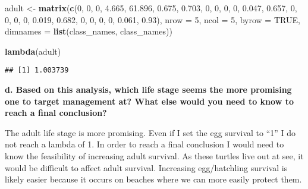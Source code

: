 \documentclass[]{article}
\newenvironment{Shaded}{\begin{snugshade}}{\end{snugshade}}
\newcommand{\KeywordTok}[1]{\textcolor[rgb]{0.13,0.29,0.53}{\textbf{#1}}}
\newcommand{\DataTypeTok}[1]{\textcolor[rgb]{0.13,0.29,0.53}{#1}}
\newcommand{\DecValTok}[1]{\textcolor[rgb]{0.00,0.00,0.81}{#1}}
\newcommand{\FloatTok}[1]{\textcolor[rgb]{0.00,0.00,0.81}{#1}}
\newcommand{\StringTok}[1]{\textcolor[rgb]{0.31,0.60,0.02}{#1}}
\newcommand{\OtherTok}[1]{\textcolor[rgb]{0.56,0.35,0.01}{#1}}
\newcommand{\NormalTok}[1]{#1}
\begin{document}
\begin{Shaded}
\begin{Highlighting}[]
\NormalTok{adult <-}\StringTok{ }\KeywordTok{matrix}\NormalTok{(}\KeywordTok{c}\NormalTok{(}\DecValTok{0}\NormalTok{, }\DecValTok{0}\NormalTok{, }\DecValTok{0}\NormalTok{, }\FloatTok{4.665}\NormalTok{, }\FloatTok{61.896}\NormalTok{,}
                \FloatTok{0.675}\NormalTok{, }\FloatTok{0.703}\NormalTok{, }\DecValTok{0}\NormalTok{, }\DecValTok{0}\NormalTok{, }\DecValTok{0}\NormalTok{,}
                \DecValTok{0}\NormalTok{, }\FloatTok{0.047}\NormalTok{, }\FloatTok{0.657}\NormalTok{, }\DecValTok{0}\NormalTok{, }\DecValTok{0}\NormalTok{,}
                \DecValTok{0}\NormalTok{, }\DecValTok{0}\NormalTok{, }\FloatTok{0.019}\NormalTok{, }\FloatTok{0.682}\NormalTok{, }\DecValTok{0}\NormalTok{,}
                \DecValTok{0}\NormalTok{, }\DecValTok{0}\NormalTok{, }\DecValTok{0}\NormalTok{, }\FloatTok{0.061}\NormalTok{, }\FloatTok{0.93}\NormalTok{),}
\DataTypeTok{nrow =} \DecValTok{5}\NormalTok{, }\DataTypeTok{ncol =} \DecValTok{5}\NormalTok{, }\DataTypeTok{byrow =} \OtherTok{TRUE}\NormalTok{, }\DataTypeTok{dimnames =} \KeywordTok{list}\NormalTok{(class_names, class_names))}

\KeywordTok{lambda}\NormalTok{(adult)}
\end{Highlighting}
\end{Shaded}

\begin{verbatim}
## [1] 1.003739
\end{verbatim}

\textbf{d. Based on this analysis, which life stage seems the more
promising one to target management at? What else would you need to know
to reach a final conclusion?}

The adult life stage is more promising. Even if I set the egg survival
to ``1'' I do not reach a lambda of 1. In order to reach a final
conclusion I would need to know the feasibility of increasing adult
survival. As these turtles live out at see, it would be difficult to
affect adult survival. Increasing egg/hatchling survival is likely
easier because it occurs on beaches where we can more easily protect
them.
\end{document}

